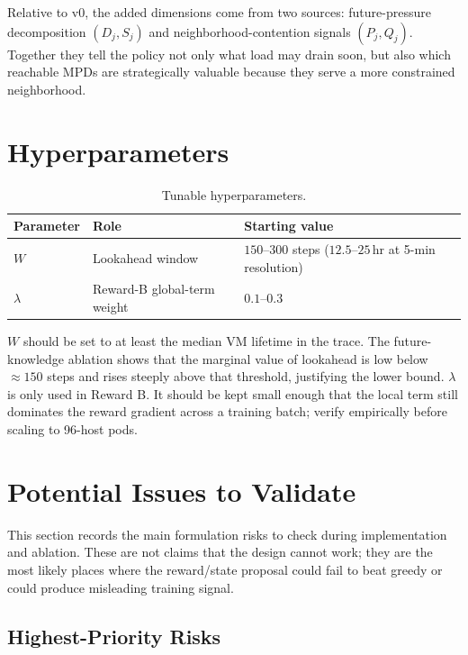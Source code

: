 \documentclass[11pt]{article}
\begin{document}
Relative to v0, the added dimensions come from two sources:
future-pressure decomposition $(D_j, S_j)$ and neighborhood-contention
signals $(P_j, Q_j)$.  Together they tell the policy not only what load
may drain soon, but also which reachable MPDs are strategically valuable
because they serve a more constrained neighborhood.

\section{Hyperparameters}

\begin{table}[h]
\centering
\caption{Tunable hyperparameters.}
\label{tab:hyperparams}
\begin{tabular}{lll}
\toprule
Parameter & Role & Starting value \\
\midrule
$W$       & Lookahead window
          & $150$--$300$ steps ($12.5$--$25$\,hr at 5-min resolution) \\
$\lambda$ & Reward-B global-term weight
          & $0.1$--$0.3$ \\
\bottomrule
\end{tabular}
\end{table}

\noindent
$W$ should be set to at least the median VM lifetime in the trace.
The future-knowledge ablation \cite{futurek} shows that the
marginal value of lookahead is low below $\approx\!150$ steps and
rises steeply above that threshold, justifying the lower bound.
$\lambda$ is only used in Reward B.  It should be kept small enough
that the local term still dominates the reward gradient across a
training batch; verify empirically before scaling to 96-host pods.

\section{Potential Issues to Validate}

This section records the main formulation risks to check during
implementation and ablation.  These are not claims that the design
cannot work; they are the most likely places where the reward/state
proposal could fail to beat greedy or could produce misleading
training signal.

\subsection{Highest-Priority Risks}
\end{document}

